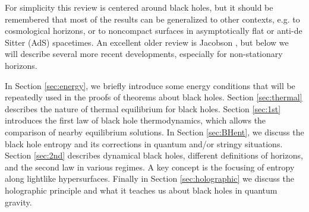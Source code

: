 \documentclass[12pt]{article}
\def\be{\begin{equation}}
\def\ee{\end{equation}}
\begin{document}
For simplicity this review is centered around black holes, but it should be remembered that most of the results can be generalized to other contexts, e.g. to cosmological horizons, or to noncompact surfaces in asymptotically flat or anti-de Sitter (AdS) spacetimes. An excellent older review is Jacobson \cite{Jacobson}, but below we will describe several more recent developments, especially for non-stationary horizons.

In Section \ref{sec:energy}, we briefly introduce some energy conditions that will be repeatedly used in the proofs of theorems about black holes. Section \ref{sec:thermal} describes the nature of thermal equilibrium for black holes. Section \ref{sec:1st} introduces the first law of black hole thermodynamics, which allows the comparison of nearby equilibrium solutions. In Section \ref{sec:BHent}, we discuss the black hole entropy and its corrections in quantum and/or stringy situations. Section \ref{sec:2nd} describes dynamical black holes, different definitions of horizons, and the second law in various regimes. A key concept is the focusing of entropy along lightlike hypersurfaces.  Finally in Section \ref{sec:holographic} we discuss the holographic principle and what it teaches us about black holes in quantum gravity.

%
%
\end{document}

